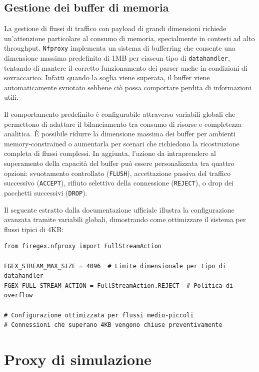 \subsection{Gestione dei buffer di memoria}

La gestione di flussi di traffico con payload di grandi dimensioni richiede un'attenzione particolare al consumo di memoria, specialmente in contesti ad alto throughput. \texttt{Nfproxy} implementa un sistema di bufferring che consente una dimensione massima predefinita di 1MB per ciascun tipo di \texttt{datahandler}, tentando di mantere il corretto funzionamento dei parser anche in condizioni di sovraccarico. Infatti quando la soglia viene superata, il buffer viene automaticamente svuotato sebbene ciò possa comportare perdita di informazioni utili.

Il comportamento predefinito è configurabile attraverso variabili globali che permettono di adattare il bilanciamento tra consumo di risorse e completezza analitica. È possibile ridurre la dimensione massima dei buffer per ambienti memory-constrained o aumentarla per scenari che richiedono la ricostruzione completa di flussi complessi. In aggiunta, l'azione da intraprendere al superamento della capacità del buffer può essere personalizzata tra quattro opzioni: svuotamento controllato (\texttt{FLUSH}), accettazione passiva del traffico successivo (\texttt{ACCEPT}), rifiuto selettivo della connessione (\texttt{REJECT}), o drop dei pacchetti successivi (\texttt{DROP}).

Il seguente estratto dalla documentazione ufficiale illustra la configurazione avanzata tramite variabili globali, dimostrando come ottimizzare il sistema per flussi tipici di 4KB:\@

\begin{listing}[H]
    \begin{verbatim}
from firegex.nfproxy import FullStreamAction

FGEX_STREAM_MAX_SIZE = 4096  # Limite dimensionale per tipo di datahandler
FGEX_FULL_STREAM_ACTION = FullStreamAction.REJECT  # Politica di overflow

# Configurazione ottimizzata per flussi medio-piccoli
# Connessioni che superano 4KB vengono chiuse preventivamente
\end{verbatim}
\end{listing}

\section{Proxy di simulazione}

